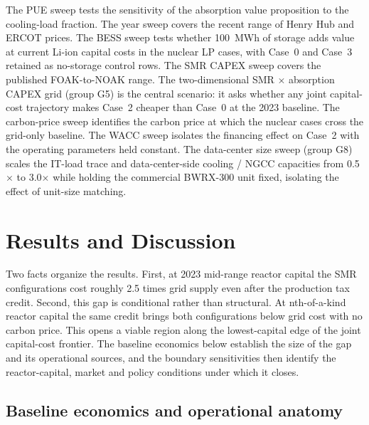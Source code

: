 \documentclass[a4paper,fleqn]{cas-sc}
\begin{document}
The PUE sweep tests the sensitivity of the absorption value proposition to the cooling-load fraction. The year sweep covers the recent range of Henry Hub and ERCOT prices. The BESS sweep tests whether 100~MWh of storage adds value at current Li-ion capital costs in the nuclear LP cases, with Case~0 and Case~3 retained as no-storage control rows. The SMR CAPEX sweep covers the published FOAK-to-NOAK range. The two-dimensional SMR $\times$ absorption CAPEX grid (group G5) is the central scenario: it asks whether any joint capital-cost trajectory makes Case~2 cheaper than Case~0 at the 2023 baseline. The carbon-price sweep identifies the carbon price at which the nuclear cases cross the grid-only baseline. The WACC sweep isolates the financing effect on Case~2 with the operating parameters held constant. The data-center size sweep (group G8) scales the IT-load trace and data-center-side cooling / NGCC capacities from 0.5$\times$ to 3.0$\times$ while holding the commercial BWRX-300 unit fixed, isolating the effect of unit-size matching.


\section{Results and Discussion}
\label{sec:results}

Two facts organize the results. First, at 2023 mid-range reactor capital the SMR configurations cost roughly 2.5 times grid supply even after the production tax credit. Second, this gap is conditional rather than structural. At nth-of-a-kind reactor capital the same credit brings both configurations below grid cost with no carbon price. This opens a viable region along the lowest-capital edge of the joint capital-cost frontier. The baseline economics below establish the size of the gap and its operational sources, and the boundary sensitivities then identify the reactor-capital, market and policy conditions under which it closes.

\subsection{Baseline economics and operational anatomy}
\label{sec:results:baseline}
\end{document}
